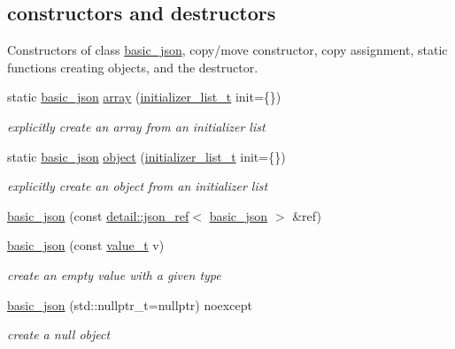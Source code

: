 \subsection*{constructors and destructors}
\label{_amgrpd94b4d3d0135946bb7bdf25e48755337}%
Constructors of class \hyperlink{classnlohmann_1_1basic__json}{basic\+\_\+json}, copy/move constructor, copy assignment, static functions creating objects, and the destructor. \begin{DoxyCompactItemize}
\item 
static \hyperlink{classnlohmann_1_1basic__json}{basic\+\_\+json} \hyperlink{classnlohmann_1_1basic__json_aa80485befaffcadaa39965494e0b4d2e}{array} (\hyperlink{classnlohmann_1_1basic__json_ad70a098fbc01c53497db29d3b5b656a9}{initializer\+\_\+list\+\_\+t} init=\{\})
\begin{DoxyCompactList}\small\item\em explicitly create an array from an initializer list \end{DoxyCompactList}\item 
static \hyperlink{classnlohmann_1_1basic__json}{basic\+\_\+json} \hyperlink{classnlohmann_1_1basic__json_aa13f7c0615867542ce80337cbcf13ada}{object} (\hyperlink{classnlohmann_1_1basic__json_ad70a098fbc01c53497db29d3b5b656a9}{initializer\+\_\+list\+\_\+t} init=\{\})
\begin{DoxyCompactList}\small\item\em explicitly create an object from an initializer list \end{DoxyCompactList}\item 
\hyperlink{classnlohmann_1_1basic__json_a2be0a411fe0e3418abc4c58889be4943}{basic\+\_\+json} (const \hyperlink{classnlohmann_1_1detail_1_1json__ref}{detail\+::json\+\_\+ref}$<$ \hyperlink{classnlohmann_1_1basic__json}{basic\+\_\+json} $>$ \&ref)
\item 
\hyperlink{classnlohmann_1_1basic__json_aed115142bd0c6c66c864700e0467df55}{basic\+\_\+json} (const \hyperlink{namespacenlohmann_1_1detail_a1ed8fc6239da25abcaf681d30ace4985}{value\+\_\+t} v)
\begin{DoxyCompactList}\small\item\em create an empty value with a given type \end{DoxyCompactList}\item 
\hyperlink{classnlohmann_1_1basic__json_ae9be9e956bfc4658f35d17c6aa72b063}{basic\+\_\+json} (std\+::nullptr\+\_\+t=nullptr) noexcept
\begin{DoxyCompactList}\small\item\em create a null object \end{DoxyCompactList}\item 

\end{DoxyCompactItemize}

